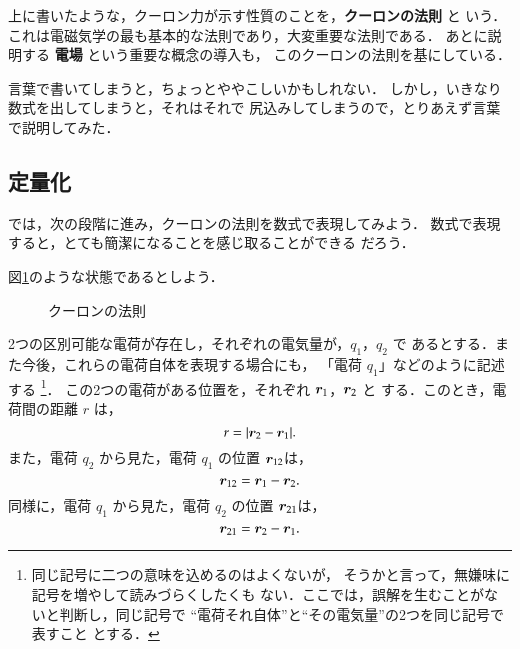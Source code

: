         上に書いたような，クーロン力が示す性質のことを，\textbf{クーロンの法則} と
        いう．これは電磁気学の最も基本的な法則であり，大変重要な法則である．
        あとに説明する \textbf{電場} という重要な概念の導入も，
        このクーロンの法則を基にしている．

        言葉で書いてしまうと，ちょっとややこしいかもしれない．
        しかし，いきなり数式を出してしまうと，それはそれで
        尻込みしてしまうので，とりあえず言葉で説明してみた．

    \subsection{定量化}
        では，次の段階に進み，クーロンの法則を数式で表現してみよう．
        数式で表現すると，とても簡潔になることを感じ取ることができる
        だろう．

        図\ref{fig:Coulombs_Force}のような状態であるとしよう．
        \begin{figure}[hbt]
            \begin{center}
                \caption{クーロンの法則}
                \label{fig:Coulombs_Force}
            \end{center}
        \end{figure}

        2つの区別可能な電荷が存在し，それぞれの電気量が，$q_{1}$，$q_{2}$ で
        あるとする．また今後，これらの電荷自体を表現する場合にも，
        「電荷 $q_{1}$」などのように記述する
            \footnote{
                同じ記号に二つの意味を込めるのはよくないが，
                そうかと言って，無嫌味に記号を増やして読みづらくしたくも
                ない．ここでは，誤解を生むことがないと判断し，同じ記号で
                “電荷それ自体”と“その電気量”の2つを同じ記号で表すこと
                とする．
            }．
        この2つの電荷がある位置を，それぞれ $\boldsymbol{r}_{1}$，$\boldsymbol{r}_{2}$ と
        する．このとき，電荷間の距離 $r$ は，
            \begin{equation*}
                r = | \boldsymbol{r}_{2} - \boldsymbol{r}_{1} |.
            \end{equation*}
        また，電荷 $q_{2}$ から見た，電荷 $q_{1}$ の位置 $\boldsymbol{r}_{12}$は，
            \begin{equation*}
                \boldsymbol{r}_{12} = \boldsymbol{r}_{1} - \boldsymbol{r}_{2}.
            \end{equation*}
        同様に，電荷 $q_{1}$ から見た，電荷 $q_{2}$ の位置 $\boldsymbol{r}_{21}$は，
            \begin{equation*}
                \boldsymbol{r}_{21} = \boldsymbol{r}_{2} - \boldsymbol{r}_{1}.
            \end{equation*}

